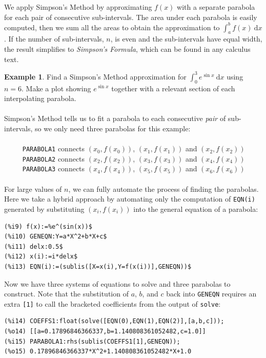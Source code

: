 \documentclass[10.5pt,twoside]{report}
\theoremstyle{definition}
\newtheorem{exmp}{Example}[section]
\begin{document}
We apply Simpson's Method by approximating $f(x)$ with a separate parabola for each pair of consecutive sub-intervals.  The area under each parabola is easily computed, then we sum all the areas to obtain the approximation to $\displaystyle \int_{a}^{b} f(x)\ \mathrm{d}x$.  If the number of sub-intervals, $n$, is even and the sub-intervals have equal width, the result simplifies to \textit{Simpson's Formula}, which can be found in any calculus text.

\begin{exmp} Find a Simpson's Method approximation for $\displaystyle \int_0^3 e^{\sin{x}}\ \mathrm{d}x$ using $n=6$.  Make a plot showing $e^{\sin{x}}$ together with a relevant section of each interpolating parabola.\\
${}$\\
Simpson's Method tells us to fit a parabola to each consecutive \textit{pair} of sub-intervals, so we only need three parabolas for this example:\\
${}$\\
\verb|     PARABOLA1| connects $(x_0,f(x_0))$, $(x_1,f(x_1))$ and $(x_2,f(x_2))$\\
\verb|     PARABOLA2| connects $(x_2,f(x_2))$, $(x_3,f(x_3))$ and $(x_4,f(x_4))$\\
\verb|     PARABOLA3| connects $(x_4,f(x_4))$, $(x_5,f(x_5))$ and $(x_6,f(x_6))$\\
${}$\\
For large values of $n$, we can fully automate the process of finding the parabolas.  Here we take a hybrid approach by automating only the computation of \verb|EQN(i)| generated by substituting $(x_i,f(x_i))$ into the general equation of a parabola:

\begin{verbatim}
(%i9) f(x):=%e^(sin(x))$
(%i10) GENEQN:Y=a*X^2+b*X+c$
(%i11) delx:0.5$
(%i12) x(i):=i*delx$
(%i13) EQN(i):=(sublis([X=x(i),Y=f(x(i))],GENEQN))$
\end{verbatim}

Now we have three systems of equations to solve and three parabolas to construct.  Note that the substitution of $a$, $b$, and $c$ back into \verb|GENEQN| requires an extra \verb|[1]| to call the bracketed coefficients from the output of \verb|solve|:

\begin{verbatim}
(%i14) COEFFS1:float(solve([EQN(0),EQN(1),EQN(2)],[a,b,c]));
(%o14) [[a=0.17896846366337,b=1.140808361052482,c=1.0]]
(%i15) PARABOLA1:rhs(sublis(COEFFS1[1],GENEQN));
(%o15) 0.17896846366337*X^2+1.140808361052482*X+1.0


\end{verbatim}
\end{exmp}
\end{document}
